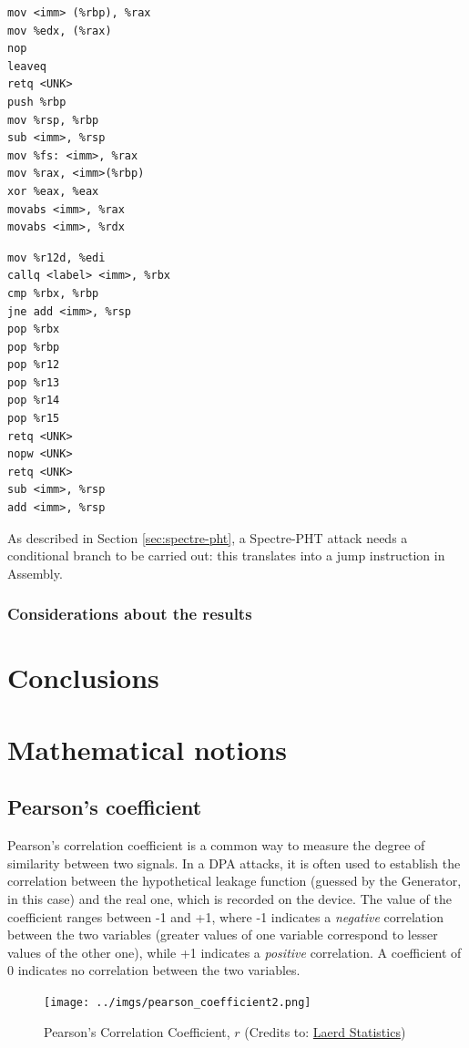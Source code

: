\documentclass[12pt,a4paper]{book}
\theoremstyle{definition}
\begin{document}
	\begin{minipage}{.45\textwidth}
	\begin{lstlisting}[caption={Window 11598-11601}]
mov <imm> (%rbp), %rax
mov %edx, (%rax)
nop
leaveq
retq <UNK>
push %rbp
mov %rsp, %rbp
sub <imm>, %rsp
mov %fs: <imm>, %rax
mov %rax, <imm>(%rbp)
xor %eax, %eax
movabs <imm>, %rax
movabs <imm>, %rdx
	\end{lstlisting}
\end{minipage}\hfill
\begin{minipage}{.45\textwidth}
	\begin{lstlisting}[caption={Window 11868-11902}]
mov %r12d, %edi
callq <label> <imm>, %rbx
cmp %rbx, %rbp
jne add <imm>, %rsp
pop %rbx
pop %rbp
pop %r12
pop %r13
pop %r14
pop %r15
retq <UNK>
nopw <UNK>
retq <UNK>
sub <imm>, %rsp
add <imm>, %rsp
	\end{lstlisting}
\end{minipage}
	\vspace{3mm}
	
	As described in Section \ref{sec:spectre-pht}, a Spectre-PHT attack needs a conditional branch to be carried out: this translates into a jump instruction in Assembly.
	\subsection{Considerations about the results}
	
	\chapter{Conclusions}
	
	\appendix
	
	\chapter{Mathematical notions}\label{appendix:maths}
	\section{Pearson's coefficient}
	Pearson's correlation coefficient \cite{Pearson1895} is a common way to measure the degree of similarity between two signals. In a DPA attacks, it is often used to establish the correlation between the hypothetical leakage function (guessed by the Generator, in this case) and the real one, which is recorded on the device. 
	The value of the coefficient ranges between -1 and +1, where -1 indicates a \textit{negative} correlation between the two variables (greater values of one variable correspond to lesser values of the other one), while +1 indicates a \textit{positive} correlation. A coefficient of 0 indicates no correlation between the two variables.	
	\begin{figure}[h!]
		\centering
		\texttt{[image: ../imgs/pearson\_coefficient2.png]}
		\caption{Pearson's Correlation Coefficient, $r$ (Credits to: \href{https://statistics.laerd.com/statistical-guides/pearson-correlation-coefficient-statistical-guide.php}{Laerd Statistics})}
		\label{fig:pearson2}
	\end{figure}
	
\end{document}
